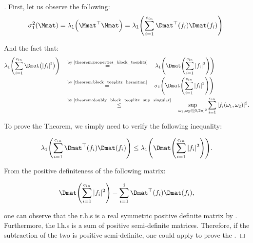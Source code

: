 \begin{proof}[]
First, let us observe the following:
\begin{equation}
    \sigma_1^2 \left( \Mmat \right) = \lambda_1 \left( \Mmat^{\top} \Mmat \right) = \lambda_1 \left( \sum_{i=1}^{\cin} \Dmat^{\top} \left(f_i \right) \Dmat (f_i) \right).
\end{equation}

And the fact that:
\begin{align}
    \lambda_1 \left( \sum_{i=1}^{\cin} \Dmat \left(|f_i|^2 \right) \right) \quad &\stackrel{\text{by \Cref{theorem:properties_block_toeplitz}}}{=} \quad \lambda_1 \left( \Dmat \left( \sum_{i=1}^{\cin} |f_i|^2 \right) \right) \\ 
    \quad &\stackrel{\text{by \Cref{theorem:block_toeplitz_hermitian}}}{=} \quad \sigma_1 \left( \Dmat \left( \sum_{i=1}^{\cin} |f_i|^2 \right) \right) \\
    \quad &\stackrel{\text{by \Cref{theorem:doubly_block_teoplitz_sup_singular}}}{\leq} \quad \sup_{\omega_1, \omega_2 \in [0, 2\pi]^2} \sum_{i=1}^{\cin} |f_i(\omega_1, \omega_2)|^2.
\end{align}

To prove the Theorem, we simply need to verify the following inequality:

\begin{equation} \label{equation:eq2}
    \lambda_1 \left( \sum_{i=1}^{\cin} \Dmat^{\top} \left(f_i \right) \Dmat (f_i) \right) \leq \lambda_1 \left( \Dmat \left( \sum_{i=1}^{\cin} |f_i|^2 \right) \right). 
\end{equation}

From the positive definiteness of the following matrix:

\begin{equation}
    \Dmat \left( \sum_{i=1}^{\cin} |f_i|^2 \right) - \sum_{i=1}^{\ci} \Dmat^{\top} \left(f_i \right) \Dmat (f_i),
\end{equation}

one can observe that the r.h.s is a real symmetric positive definite matrix by . Furthermore, the l.h.s is a sum of positive semi-definite matrices. Therefore, if the subtraction of the two is positive semi-definite, one could apply  to prove the . 



\end{proof}
